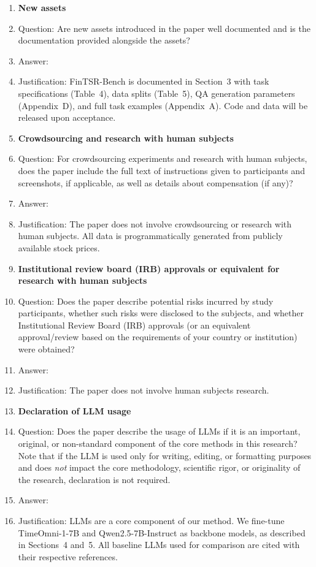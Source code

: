 \begin{enumerate}
\item {\bf New assets}
    \item[] Question: Are new assets introduced in the paper well documented and is the documentation provided alongside the assets?
    \item[] Answer: \answerYes{}
    \item[] Justification: FinTSR-Bench is documented in Section~3 with task specifications (Table~4), data splits (Table~5), QA generation parameters (Appendix~D), and full task examples (Appendix~A). Code and data will be released upon acceptance.

\item {\bf Crowdsourcing and research with human subjects}
    \item[] Question: For crowdsourcing experiments and research with human subjects, does the paper include the full text of instructions given to participants and screenshots, if applicable, as well as details about compensation (if any)?
    \item[] Answer: \answerNA{}
    \item[] Justification: The paper does not involve crowdsourcing or research with human subjects. All data is programmatically generated from publicly available stock prices.

\item {\bf Institutional review board (IRB) approvals or equivalent for research with human subjects}
    \item[] Question: Does the paper describe potential risks incurred by study participants, whether such risks were disclosed to the subjects, and whether Institutional Review Board (IRB) approvals (or an equivalent approval/review based on the requirements of your country or institution) were obtained?
    \item[] Answer: \answerNA{}
    \item[] Justification: The paper does not involve human subjects research.

\item {\bf Declaration of LLM usage}
    \item[] Question: Does the paper describe the usage of LLMs if it is an important, original, or non-standard component of the core methods in this research? Note that if the LLM is used only for writing, editing, or formatting purposes and does \emph{not} impact the core methodology, scientific rigor, or originality of the research, declaration is not required.
    \item[] Answer: \answerYes{}
    \item[] Justification: LLMs are a core component of our method. We fine-tune TimeOmni-1-7B and Qwen2.5-7B-Instruct as backbone models, as described in Sections~4 and~5. All baseline LLMs used for comparison are cited with their respective references.

\end{enumerate}

